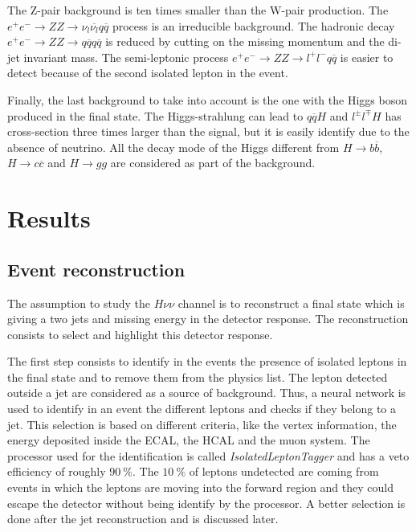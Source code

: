     The Z-pair background is ten times smaller than the W-pair production.
    The  $e^+e^- \rightarrow ZZ \rightarrow \nu_{l}\overline{\nu_{l}}q \overline{q}$ process is an irreducible background.
    The hadronic decay $e^+e^- \rightarrow ZZ \rightarrow q\overline{q} q\overline{q}$ is reduced by cutting on the missing momentum and the di-jet invariant mass.
    The semi-leptonic process $e^+e^- \rightarrow ZZ \rightarrow l^+l^- q\overline{q}$ is easier to detect because of the second isolated lepton in the event.

    Finally, the last background to take into account is the one with the Higgs boson produced in the final state.
    The Higgs-strahlung can lead to $q\overline{q}H$ and $l^{\pm}l^{\mp}H$ has cross-section three times larger than the signal, but it is easily identify due to the absence of neutrino.
    All the decay mode of the Higgs different from $H \rightarrow b\overline{b}$, $H \rightarrow c\overline{c}$ and $H \rightarrow gg$ are considered as part of the background.

  \section{Results}
 
    \subsection{Event reconstruction}

    The assumption to study the $H \nu\nu$ channel is to reconstruct a final state which is giving a two jets and missing energy in the detector response.
    The reconstruction consists to select and highlight this detector response.

    The first step consists to identify in the events the presence of isolated leptons in the final state and to remove them from the physics list.
    The lepton detected outside a jet are considered as a source of background.
    Thus, a neural network is used to identify in an event the different leptons and checks if they belong to a jet.
    This selection is based on different criteria, like the vertex information, the energy deposited inside the \gls{ECAL}, the \gls{HCAL} and the muon system. 
    The processor used for the identification is called \textit{IsolatedLeptonTagger} and has a veto efficiency of roughly $90~\%$.
    The $10~\%$ of leptons undetected are coming from events in which the leptons are moving into the forward region and they could escape the detector without being identify by the processor.
    A better selection is done after the jet reconstruction and is discussed later.

